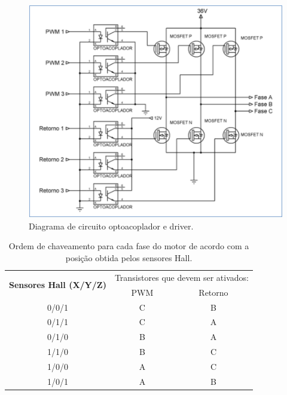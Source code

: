 			\graphicspath{{figuras/}}
			\begin{figure}[h!]
				\centering
				\includegraphics[scale=1.4]{Figura12_circuito_optoacoplador_e_driver.PNG}
				\caption{Diagrama de circuito optoacoplador e driver.}
				\label{img:Diagrama_do_circuito_optoacoplador_e_driver}
			\end{figure}
		
		
		\begin{table}[!htb]
			\caption{Ordem de chaveamento para cada fase do motor de acordo com a posição obtida pelos sensores Hall.}
			\centering
			\label{Ordem_de_chaveamento_para_cada_fase_do_motor_de_acordo_com_a_posição_obtida_pelos_sensores_Hall}
			\begin{tabular}{ccc}
				\multirow{2}{*}{\textbf{Sensores Hall (X/Y/Z)}} & \multicolumn{2}{c}{Transistores que devem ser ativados:} \\
				& PWM & Retorno \\ \hline
				0/0/1 & C & B \\ \hline
				0/1/1 & C & A \\ \hline
				0/1/0 & B & A \\ \hline
				1/1/0 & B & C \\ \hline
				1/0/0 & A & C \\ \hline
				1/0/1 & A & B \\ \hline
			\end{tabular}
		\end{table}
		
